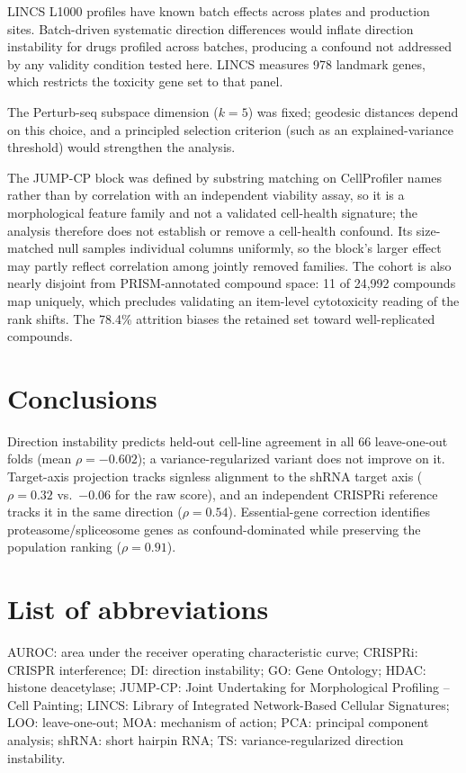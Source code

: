 \documentclass[11pt]{article}
\begin{document}
LINCS L1000 profiles have known batch effects across plates and
production sites. Batch-driven systematic direction differences would
inflate direction instability for drugs profiled across batches,
producing a confound not addressed by any validity condition tested here.
LINCS measures 978 landmark genes, which restricts the toxicity gene set to
that panel.

The Perturb-seq subspace dimension ($k = 5$) was fixed; geodesic
distances depend on this choice, and a principled selection criterion
(such as an explained-variance threshold) would strengthen the analysis.

The JUMP-CP block was defined by substring matching on CellProfiler names
rather than by correlation with an independent viability assay, so it is a
morphological feature family and not a validated cell-health signature; the
analysis therefore does not establish or remove a cell-health confound. Its
size-matched null samples individual columns uniformly, so the block's larger
effect may partly reflect correlation among jointly removed families. The
cohort is also nearly disjoint from PRISM-annotated compound space: 11 of
24{,}992 compounds map uniquely, which precludes validating an item-level
cytotoxicity reading of the rank shifts. The 78.4\% attrition biases the
retained set toward well-replicated compounds.

\section{Conclusions}

Direction instability predicts held-out cell-line agreement in all 66
leave-one-out folds (mean $\rho = -0.602$); a variance-regularized variant
does not improve on it.
Target-axis projection tracks signless alignment to the shRNA target axis
($\rho = 0.32$ vs.\ $-0.06$ for the raw score), and an independent CRISPRi
reference tracks it in the same direction ($\rho = 0.54$). Essential-gene
correction identifies proteasome/spliceosome genes as confound-dominated
while preserving the
population ranking ($\rho = 0.91$).

\section*{List of abbreviations}
AUROC: area under the receiver operating characteristic curve;
CRISPRi: CRISPR interference;
DI: direction instability;
GO: Gene Ontology;
HDAC: histone deacetylase;
JUMP-CP: Joint Undertaking for Morphological Profiling -- Cell Painting;
LINCS: Library of Integrated Network-Based Cellular Signatures;
LOO: leave-one-out;
MOA: mechanism of action;
PCA: principal component analysis;
shRNA: short hairpin RNA;
TS: variance-regularized direction instability.
\end{document}
